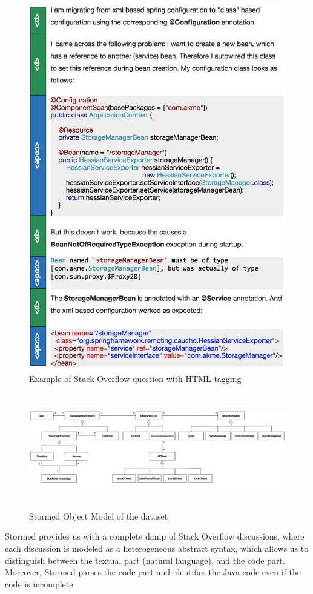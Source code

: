 \documentclass[12pt,mscthesis]{usiinfthesis}
\begin{document}
	\begin{figure}[htbp]
	 \centering
	\includegraphics[width=\textwidth]{stackOverflow}
	\caption{Example of Stack Overflow question with HTML tagging}
	\label{stackOverflow}
	\end{figure}

	\begin{figure}[htbp]
	\centering
	\includegraphics[width=\textwidth,height=5cm]{stormed}
	\caption{Stormed Object Model of the dataset}
	\label{stormed}
	\end{figure}
\newpage
	Stormed provides us with a complete damp of Stack Overflow discussions, where each discussion is modeled as a heterogeneous abstract syntax, which allows us to distinguish between the textual part (natural language), and the code part. Moreover, Stormed parses the code part and identifies the Java code even if the code is incomplete.
\end{document}
